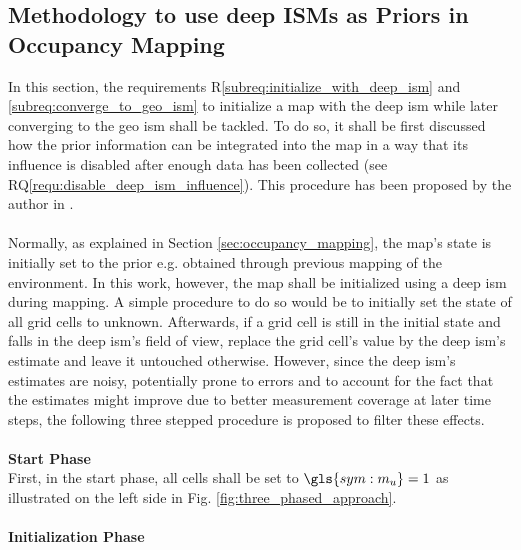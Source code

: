 \subsection{Methodology to use deep ISMs as Priors in Occupancy Mapping}
\label{subsec:method_to_use_deep_isms_as_priors_in_occmaps}
In this section, the requirements R\ref{subreq:initialize_with_deep_ism} and \ref{subreq:converge_to_geo_ism} to initialize a map with the deep \gls{ism} while later converging to the geo \gls{ism} shall be tackled. To do so, it shall be first discussed how the prior information can be integrated into the map in a way that its influence is disabled after enough data has been collected (see RQ\ref{requ:disable_deep_ism_influence}). This procedure has been proposed by the author in \cite{bauer2020deep}.
\\\\
Normally, as explained in Section \ref{sec:occupancy_mapping}, the map's state is initially set to the prior e.g. obtained through previous mapping of the environment. In this work, however, the map shall be initialized using a deep \gls{ism} during mapping. A simple procedure to do so would be to initially set the state of all grid cells to unknown. Afterwards, if a grid cell is still in the initial state and falls in the deep \gls{ism}'s field of view, replace the grid cell's value by the deep \gls{ism}'s estimate and leave it untouched otherwise. However, since the deep \gls{ism}'s estimates are noisy, potentially prone to errors and to account for the fact that the estimates might improve due to better measurement coverage at later time steps, the following three stepped procedure is proposed to filter these effects. 
\\\\
\textbf{Start Phase}\\
First, in the start phase, all cells shall be set to $\gls{sym:m_u} = 1$ as illustrated on the left side in Fig. \ref{fig:three_phased_approach}. 
\\\\
\textbf{Initialization Phase}\\
